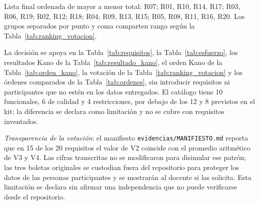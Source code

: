 Lista final ordenada de mayor a menor total: R07; R01, R10, R14, R17; R03, R06, R19; R02, R12; R18; R04; R09, R13, R15; R05, R08, R11, R16, R20. Los grupos separados por punto y coma comparten rango según la Tabla~\ref{tab:ranking_votacion}.

La decisión se apoya en la Tabla~\ref{tab:requisitos}, la Tabla~\ref{tab:esfuerzo}, los resultados Kano de la Tabla~\ref{tab:resultado_kano}, el orden Kano de la Tabla~\ref{tab:orden_kano}, la votación de la Tabla~\ref{tab:ranking_votacion} y los órdenes comparados de la Tabla~\ref{tab:ordenes}, sin introducir requisitos ni participantes que no estén en los datos entregados. El catálogo tiene 10 funcionales, 6 de calidad y 4 restricciones, por debajo de los 12 y 8 previstos en el kit; la diferencia se declara como limitación y no se cubre con requisitos inventados.

\emph{Transparencia de la votación}: el manifiesto \texttt{evidencias/MANIFIESTO.md} reporta que en 15 de los 20 requisitos el valor de V2 coincide con el promedio aritmético de V3 y V4. Las cifras transcritas no se modificaron para disimular ese patrón; las tres boletas originales se custodian fuera del repositorio para proteger los datos de las personas participantes y se mostrarán al docente si las solicita. Esta limitación se declara sin afirmar una independencia que no puede verificarse desde el repositorio.
